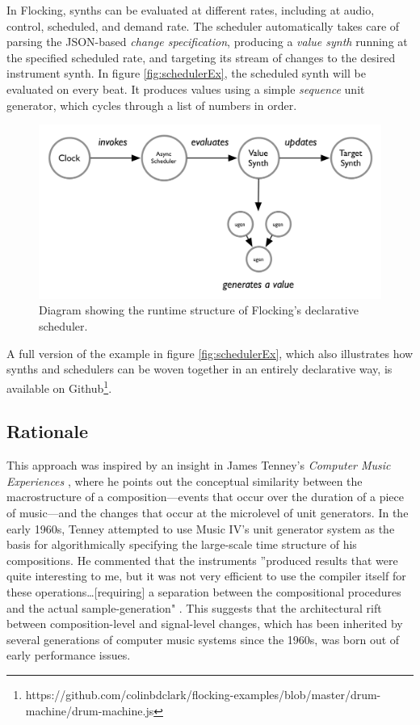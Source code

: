 \documentclass{article}
\begin{document}
In Flocking, synths can be evaluated at different rates, including at audio, control, scheduled, and demand rate. The scheduler automatically takes care of parsing the JSON-based {\it change specification}, producing a {\it value synth} running at the specified scheduled rate, and targeting its stream of changes to the desired instrument synth. In figure \ref{fig:schedulerEx}, the scheduled synth will be evaluated on every beat. It produces values using a simple {\it sequence} unit generator, which cycles through a list of numbers in order.

\begin{figure}[ht]
\centering
\includegraphics[width=0.9\columnwidth]{images/scheduler.png}
\caption{ Diagram showing the runtime structure of Flocking's declarative scheduler.\label{fig:scheduler}}
\end{figure}

A full version of the example in figure \ref{fig:schedulerEx}, which also illustrates how synths and schedulers can be woven together in an entirely declarative way, is available on Github\footnote{https://github.com/colinbdclark/flocking-examples/blob/master/drum-machine/drum-machine.js}.

\subsection{Rationale}

This approach was inspired by an insight in James Tenney's {\it Computer Music Experiences} \cite{tenney1969computer}, where he points out the conceptual similarity between the macrostructure of a composition---events that occur over the duration of a piece of music---and the changes that occur at the microlevel of unit generators. In the early 1960s, Tenney attempted to use Music IV's unit generator system as the basis for algorithmically specifying the large-scale time structure of his compositions. He commented that the instruments ''produced results that were quite interesting to me, but it was not very efficient to use the compiler itself for these operations\ldots [requiring] a separation between the compositional procedures and the actual sample-generation" \cite[p.41--42]{tenney1969computer}. This suggests that the architectural rift between composition-level and signal-level changes, which has been inherited by several generations of computer music systems since the 1960s, was born out of early performance issues.
\end{document}
